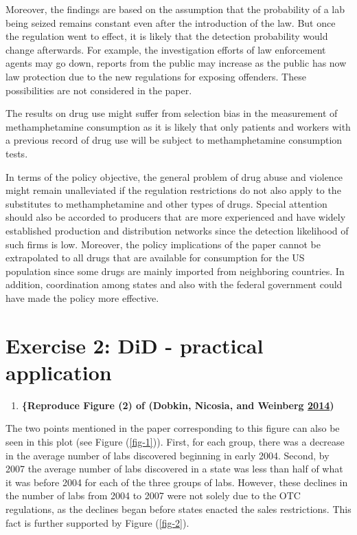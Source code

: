 \documentclass[
  11pt,
]{article}
\providecommand{\tightlist}{%
  \setlength{\itemsep}{0pt}\setlength{\parskip}{0pt}}
\begin{document}
Moreover, the findings are based on the assumption that the probability
of a lab being seized remains constant even after the introduction of
the law. But once the regulation went to effect, it is likely that the
detection probability would change afterwards. For example, the
investigation efforts of law enforcement agents may go down, reports
from the public may increase as the public has now law protection due to
the new regulations for exposing offenders. These possibilities are not
considered in the paper.

The results on drug use might suffer from selection bias in the
measurement of methamphetamine consumption as it is likely that only
patients and workers with a previous record of drug use will be subject
to methamphetamine consumption tests.

In terms of the policy objective, the general problem of drug abuse and
violence might remain unalleviated if the regulation restrictions do not
also apply to the substitutes to methamphetamine and other types of
drugs. Special attention should also be accorded to producers that are
more experienced and have widely established production and distribution
networks since the detection likelihood of such firms is low. Moreover,
the policy implications of the paper cannot be extrapolated to all drugs
that are available for consumption for the US population since some
drugs are mainly imported from neighboring countries. In addition,
coordination among states and also with the federal government could
have made the policy more effective.

\hypertarget{exercise-2-did---practical-application}{%
\section{Exercise 2: DiD - practical
application}\label{exercise-2-did---practical-application}}

\begin{enumerate}
\def\labelenumi{(\alph{enumi})}
\tightlist
\item
  \textbf{\{Reproduce Figure (2) of (Dobkin, Nicosia, and Weinberg
  \protect\hyperlink{ref-DOBKIN201448}{2014})}
\end{enumerate}

The two points mentioned in the paper corresponding to this figure can
also be seen in this plot (see Figure (\ref{fig-1})). First, for each
group, there was a decrease in the average number of labs discovered
beginning in early 2004. Second, by 2007 the average number of labs
discovered in a state was less than half of what it was before 2004 for
each of the three groups of labs. However, these declines in the number
of labs from 2004 to 2007 were not solely due to the OTC regulations, as
the declines began before states enacted the sales restrictions. This
fact is further supported by Figure (\ref{fig-2}).
\end{document}

